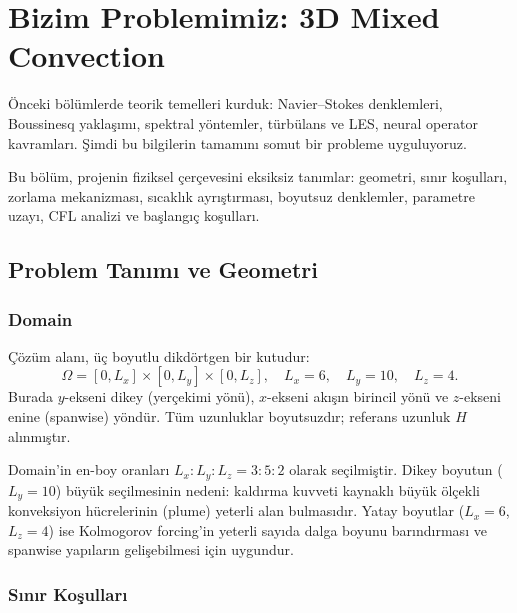
\chapter{Bizim Problemimiz: 3D Mixed Convection}
\label{ch:bizim_problem}

\"Onceki bölümlerde teorik temelleri kurduk: Navier--Stokes denklemleri, Boussinesq yaklaşımı, spektral yöntemler, türbülans ve LES, neural operator kavramları. Şimdi bu bilgilerin tamamını somut bir probleme uyguluyoruz.

Bu bölüm, projenin fiziksel çerçevesini eksiksiz tanımlar: geometri, sınır koşulları, zorlama mekanizması, sıcaklık ayrıştırması, boyutsuz denklemler, parametre uzayı, CFL analizi ve başlangıç koşulları.


\section{Problem Tanımı ve Geometri}
\label{sec:problem_tanim}

\subsection{Domain}

Çözüm alanı, üç boyutlu dikdörtgen bir kutudur:
\begin{equation}
    \Omega = [0, L_x] \times [0, L_y] \times [0, L_z], \quad
    L_x = 6, \quad L_y = 10, \quad L_z = 4.
    \label{eq:domain}
\end{equation}
Burada $y$-ekseni dikey (yerçekimi yönü), $x$-ekseni akışın birincil yönü ve $z$-ekseni enine (spanwise) yöndür. Tüm uzunluklar boyutsuzdır; referans uzunluk $H$ alınmıştır.

Domain'in en-boy oranları $L_x : L_y : L_z = 3:5:2$ olarak seçilmiştir. Dikey boyutun ($L_y = 10$) büyük seçilmesinin nedeni: kaldırma kuvveti kaynaklı büyük ölçekli konveksiyon hücrelerinin (plume) yeterli alan bulmasıdır. Yatay boyutlar ($L_x = 6$, $L_z = 4$) ise Kolmogorov forcing'in yeterli sayıda dalga boyunu barındırması ve spanwise yapıların gelişebilmesi için uygundur.

\subsection{Sınır Koşulları}

